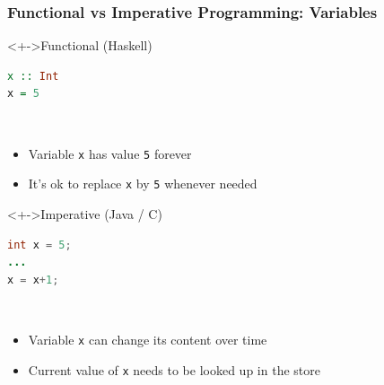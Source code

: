\documentclass{beamer}
\begin{document}
\begin{frame}[fragile]
  \frametitle{Functional vs Imperative Programming: Variables}
  \begin{block}<+->{Functional (Haskell)}
    \begin{minipage}[t]{0.45\linewidth}
\begin{lstlisting}[language=Haskell]
x :: Int
x = 5
\end{lstlisting}
    \end{minipage}
    ~
    \begin{minipage}[t]{0.45\linewidth}
      \begin{itemize}
      \item Variable \texttt{x} has value \texttt{5} forever
      \item It's ok to replace \texttt{x} by \texttt{5} whenever needed
      \end{itemize}
    \end{minipage}
  \end{block}
  \begin{block}<+->{Imperative (Java / C)}
    \begin{minipage}[t]{0.45\linewidth}
\begin{lstlisting}[language=Java]
int x = 5;
...
x = x+1;
\end{lstlisting}
    \end{minipage}
    ~
    \begin{minipage}[t]{0.45\linewidth}
      \begin{itemize}
      \item Variable \texttt{x} can change its content over time
      \item Current value of \texttt{x} needs to be looked up in the store
      \end{itemize}
    \end{minipage}
  \end{block}
\end{frame}
\end{document}
